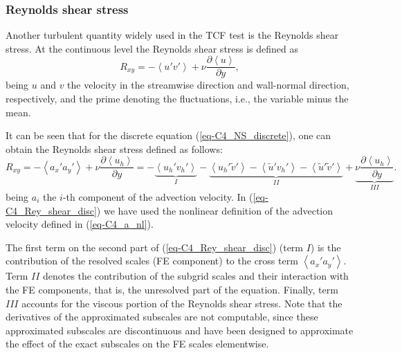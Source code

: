 \subsubsection{Reynolds shear stress}

Another turbulent quantity widely used in the TCF test is the Reynolds shear stress. At the continuous level the Reynolds shear stress is defined as
\begin{equation}
\label{eq-C4_Rey_shear_cont}
R_{xy}=-\left\langle u'v'\right\rangle+\nu\frac{\partial\left\langle u\right\rangle}{\partial y},
\end{equation}
being $u$ and $v$ the velocity in the streamwise direction and wall-normal direction, respectively,
and the prime denoting the fluctuations, i.e., the variable minus the mean.

It can be seen that for the discrete equation (\ref{eq-C4_NS_discrete}), one can obtain the Reynolds shear stress defined as follows:
\begin{equation}
\label{eq-C4_Rey_shear_disc}
R_{xy}=-\left\langle a_x'a_y'\right\rangle+\nu\frac{\partial\left\langle u_h\right\rangle}{\partial y}=-\underbrace{\left\langle u_h'v_h'\right\rangle}_I-\underbrace{\left\langle u_h'\tilde{v}'\right\rangle-\left\langle \tilde{u}'v_h'\right\rangle-\left\langle \tilde{u}'\tilde{v}'\right\rangle}_{II}+\underbrace{\nu\frac{\partial\left\langle u_h\right\rangle}{\partial y}}_{III}.
\end{equation}
being $a_i$ the $i$-th component of the advection velocity. In (\ref{eq-C4_Rey_shear_disc}) we have used the nonlinear definition of the advection velocity defined in (\ref{eq-C4_a_nl}).

The first term on the second part of  (\ref{eq-C4_Rey_shear_disc}) (term $I$) is the contribution of the resolved scales (FE component) to the cross term $\left\langle a_x'a_y'\right\rangle$. Term $II$ denotes the contribution of the subgrid scales and their interaction with the FE components, that is, the unresolved part of the equation. Finally, term $III$ accounts for the viscous portion of the Reynolds shear stress. Note that the derivatives of the approximated subscales are not computable, since these approximated subscales are discontinuous and have been designed to approximate the effect of the exact subscales on the FE scales elementwise. 

